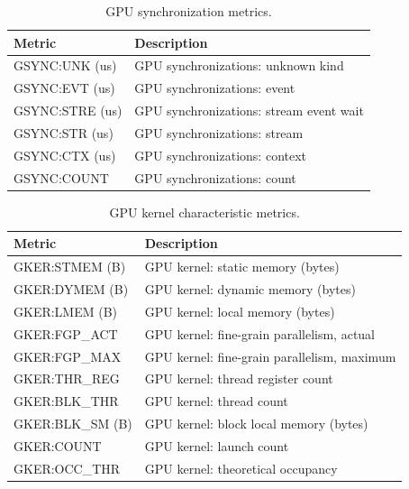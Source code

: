 \begin{table}[h]
\centering
\begin{tabular}{|l|l|}\hline
Metric & Description\\\hline\hline
 GSYNC:UNK (us)  &  GPU synchronizations: unknown kind  \\\hline 
  GSYNC:EVT (us)  &  GPU synchronizations: event  \\\hline 
  GSYNC:STRE (us)  &  GPU synchronizations: stream event wait  \\\hline 
  GSYNC:STR (us)  &  GPU synchronizations: stream  \\\hline 
  GSYNC:CTX (us)  &  GPU synchronizations: context  \\\hline 
  GSYNC:COUNT  &  GPU synchronizations: count  \\\hline 
\end{tabular}
\caption{GPU synchronization metrics.}
\label{table:gsync}
\end{table}


\begin{table}[h]
\centering
\begin{tabular}{|l|l|}\hline
Metric & Description\\\hline\hline
GKER:STMEM (B) & GPU kernel: static memory (bytes)    \\\hline
GKER:DYMEM (B) & GPU kernel: dynamic memory (bytes)   \\\hline
GKER:LMEM (B) & GPU kernel: local memory (bytes)    \\\hline
GKER:FGP\_ACT & GPU kernel: fine-grain parallelism, actual    \\\hline
GKER:FGP\_MAX & GPU kernel: fine-grain parallelism, maximum    \\\hline
GKER:THR\_REG & GPU kernel: thread register count    \\\hline
GKER:BLK\_THR & GPU kernel: thread count   \\\hline
GKER:BLK\_SM (B) & GPU kernel: block local memory (bytes)   \\\hline
GKER:COUNT & GPU kernel: launch count   \\\hline
GKER:OCC\_THR & GPU kernel: theoretical occupancy    \\\hline
\end{tabular}
\caption{GPU kernel characteristic metrics.}
\label{table:gker}
\end{table}

